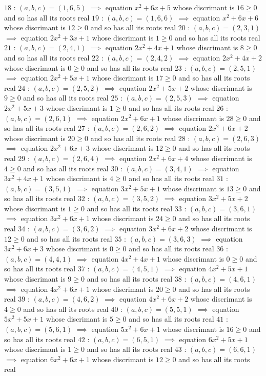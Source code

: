 \begin{solution}
$18$ : $(a,b,c)=(1,6,5)$ $\implies$ equation $x^2+6x+5$ whose discrimant is $16\ge 0$ and so has all its roots real
$19$ : $(a,b,c)=(1,6,6)$ $\implies$ equation $x^2+6x+6$ whose discrimant is $12\ge 0$ and so has all its roots real
$20$ : $(a,b,c)=(2,3,1)$ $\implies$ equation $2x^2+3x+1$ whose discrimant is $1\ge 0$ and so has all its roots real
$21$ : $(a,b,c)=(2,4,1)$ $\implies$ equation $2x^2+4x+1$ whose discrimant is $8\ge 0$ and so has all its roots real
$22$ : $(a,b,c)=(2,4,2)$ $\implies$ equation $2x^2+4x+2$ whose discrimant is $0\ge 0$ and so has all its roots real
$23$ : $(a,b,c)=(2,5,1)$ $\implies$ equation $2x^2+5x+1$ whose discrimant is $17\ge 0$ and so has all its roots real
$24$ : $(a,b,c)=(2,5,2)$ $\implies$ equation $2x^2+5x+2$ whose discrimant is $9\ge 0$ and so has all its roots real
$25$ : $(a,b,c)=(2,5,3)$ $\implies$ equation $2x^2+5x+3$ whose discrimant is $1\ge 0$ and so has all its roots real
$26$ : $(a,b,c)=(2,6,1)$ $\implies$ equation $2x^2+6x+1$ whose discrimant is $28\ge 0$ and so has all its roots real
$27$ : $(a,b,c)=(2,6,2)$ $\implies$ equation $2x^2+6x+2$ whose discrimant is $20\ge 0$ and so has all its roots real
$28$ : $(a,b,c)=(2,6,3)$ $\implies$ equation $2x^2+6x+3$ whose discrimant is $12\ge 0$ and so has all its roots real
$29$ : $(a,b,c)=(2,6,4)$ $\implies$ equation $2x^2+6x+4$ whose discrimant is $4\ge 0$ and so has all its roots real
$30$ : $(a,b,c)=(3,4,1)$ $\implies$ equation $3x^2+4x+1$ whose discrimant is $4\ge 0$ and so has all its roots real
$31$ : $(a,b,c)=(3,5,1)$ $\implies$ equation $3x^2+5x+1$ whose discrimant is $13\ge 0$ and so has all its roots real
$32$ : $(a,b,c)=(3,5,2)$ $\implies$ equation $3x^2+5x+2$ whose discrimant is $1\ge 0$ and so has all its roots real
$33$ : $(a,b,c)=(3,6,1)$ $\implies$ equation $3x^2+6x+1$ whose discrimant is $24\ge 0$ and so has all its roots real
$34$ : $(a,b,c)=(3,6,2)$ $\implies$ equation $3x^2+6x+2$ whose discrimant is $12\ge 0$ and so has all its roots real
$35$ : $(a,b,c)=(3,6,3)$ $\implies$ equation $3x^2+6x+3$ whose discrimant is $0\ge 0$ and so has all its roots real
$36$ : $(a,b,c)=(4,4,1)$ $\implies$ equation $4x^2+4x+1$ whose discrimant is $0\ge 0$ and so has all its roots real
$37$ : $(a,b,c)=(4,5,1)$ $\implies$ equation $4x^2+5x+1$ whose discrimant is $9\ge 0$ and so has all its roots real
$38$ : $(a,b,c)=(4,6,1)$ $\implies$ equation $4x^2+6x+1$ whose discrimant is $20\ge 0$ and so has all its roots real
$39$ : $(a,b,c)=(4,6,2)$ $\implies$ equation $4x^2+6x+2$ whose discrimant is $4\ge 0$ and so has all its roots real
$40$ : $(a,b,c)=(5,5,1)$ $\implies$ equation $5x^2+5x+1$ whose discrimant is $5\ge 0$ and so has all its roots real
$41$ : $(a,b,c)=(5,6,1)$ $\implies$ equation $5x^2+6x+1$ whose discrimant is $16\ge 0$ and so has all its roots real
$42$ : $(a,b,c)=(6,5,1)$ $\implies$ equation $6x^2+5x+1$ whose discrimant is $1\ge 0$ and so has all its roots real
$43$ : $(a,b,c)=(6,6,1)$ $\implies$ equation $6x^2+6x+1$ whose discrimant is $12\ge 0$ and so has all its roots real
\end{solution}



